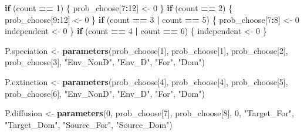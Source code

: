 \documentclass[]{book}
\newenvironment{Shaded}{\begin{snugshade}}{\end{snugshade}}
\newcommand{\KeywordTok}[1]{\textcolor[rgb]{0.13,0.29,0.53}{\textbf{{#1}}}}
\newcommand{\DecValTok}[1]{\textcolor[rgb]{0.00,0.00,0.81}{{#1}}}
\newcommand{\StringTok}[1]{\textcolor[rgb]{0.31,0.60,0.02}{{#1}}}
\newcommand{\ControlFlowTok}[1]{\textcolor[rgb]{0.13,0.29,0.53}{\textbf{{#1}}}}
\newcommand{\OperatorTok}[1]{\textcolor[rgb]{0.81,0.36,0.00}{\textbf{{#1}}}}
\newcommand{\NormalTok}[1]{{#1}}
\theoremstyle{definition}
\theoremstyle{definition}
\theoremstyle{remark}
\begin{document}
\begin{Shaded}
\begin{Highlighting}[]
        
    \ControlFlowTok{if}\NormalTok{ (count }\OperatorTok{==}\StringTok{ }\DecValTok{1}\NormalTok{) \{}
\NormalTok{      prob_choose[}\DecValTok{7}\OperatorTok{:}\DecValTok{12}\NormalTok{] <-}\StringTok{ }\DecValTok{0}
\NormalTok{    \}}
    \ControlFlowTok{if}\NormalTok{ (count }\OperatorTok{==}\StringTok{ }\DecValTok{2}\NormalTok{) \{}
\NormalTok{      prob_choose[}\DecValTok{9}\OperatorTok{:}\DecValTok{12}\NormalTok{] <-}\StringTok{ }\DecValTok{0}
\NormalTok{    \}}
    \ControlFlowTok{if}\NormalTok{ (count }\OperatorTok{==}\StringTok{ }\DecValTok{3} \OperatorTok{|}\StringTok{ }\NormalTok{count }\OperatorTok{==}\StringTok{ }\DecValTok{5}\NormalTok{) \{}
\NormalTok{      prob_choose[}\DecValTok{7}\OperatorTok{:}\DecValTok{8}\NormalTok{] <-}\StringTok{ }\DecValTok{0}
\NormalTok{      independent <-}\StringTok{ }\DecValTok{0}
\NormalTok{    \}}
    \ControlFlowTok{if}\NormalTok{ (count }\OperatorTok{==}\StringTok{ }\DecValTok{4} \OperatorTok{|}\StringTok{ }\NormalTok{count }\OperatorTok{==}\StringTok{ }\DecValTok{6}\NormalTok{) \{}
\NormalTok{      independent <-}\StringTok{ }\DecValTok{0}
\NormalTok{    \}}
    
    
\NormalTok{    P.speciation <-}\StringTok{ }\KeywordTok{parameters}\NormalTok{(prob_choose[}\DecValTok{1}\NormalTok{], prob_choose[}\DecValTok{1}\NormalTok{],}
\NormalTok{                               prob_choose[}\DecValTok{2}\NormalTok{], prob_choose[}\DecValTok{3}\NormalTok{],}
                               \StringTok{"Env_NonD"}\NormalTok{, }\StringTok{"Env_D"}\NormalTok{, }\StringTok{"For"}\NormalTok{, }\StringTok{"Dom"}\NormalTok{)}

\NormalTok{    P.extinction  <-}\StringTok{ }\KeywordTok{parameters}\NormalTok{(prob_choose[}\DecValTok{4}\NormalTok{], prob_choose[}\DecValTok{4}\NormalTok{],}
\NormalTok{                                prob_choose[}\DecValTok{5}\NormalTok{], prob_choose[}\DecValTok{6}\NormalTok{],}
                                \StringTok{"Env_NonD"}\NormalTok{, }\StringTok{"Env_D"}\NormalTok{, }\StringTok{"For"}\NormalTok{, }\StringTok{"Dom"}\NormalTok{)}

    
\NormalTok{    P.diffusion <-}\StringTok{ }\KeywordTok{parameters}\NormalTok{(}\DecValTok{0}\NormalTok{, prob_choose[}\DecValTok{7}\NormalTok{],}
\NormalTok{                              prob_choose[}\DecValTok{8}\NormalTok{], }\DecValTok{0}\NormalTok{,}
                              \StringTok{"Target_For"}\NormalTok{, }\StringTok{"Target_Dom"}\NormalTok{,}
                              \StringTok{"Source_For"}\NormalTok{, }\StringTok{"Source_Dom"}\NormalTok{)}
    

\end{Highlighting}
\end{Shaded}
\end{document}
